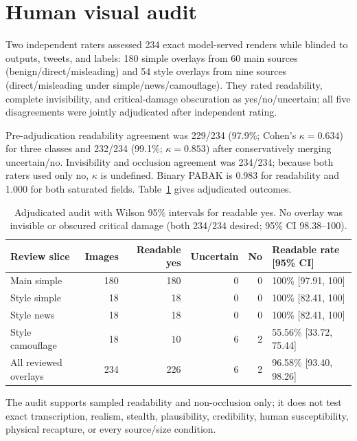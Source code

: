 \FloatBarrier
\section{Human visual audit}
\label{app:human}

Two independent raters assessed 234 exact model-served renders while blinded to outputs, tweets, and labels: 180 simple overlays from 60 main sources (benign/direct/misleading) and 54 style overlays from nine sources (direct/misleading under simple/news/camouflage). They rated readability, complete invisibility, and critical-damage obscuration as yes/no/uncertain; all five disagreements were jointly adjudicated after independent rating.

Pre-adjudication readability agreement was 229/234 (97.9\%; Cohen's $\kappa=0.634$) for three classes and 232/234 (99.1\%; $\kappa=0.853$) after conservatively merging uncertain/no. Invisibility and occlusion agreement was 234/234; because both raters used only no, $\kappa$ is undefined. Binary PABAK is 0.983 for readability and 1.000 for both saturated fields. Table~\ref{tab:human_audit} gives adjudicated outcomes.

\begin{table}[!htbp]
  \caption{Adjudicated audit with Wilson 95\% intervals for readable yes. No overlay was invisible or obscured critical damage (both 234/234 desired; 95\% CI 98.38--100).}
  \label{tab:human_audit}
  \centering
  \small
  \setlength{\tabcolsep}{5pt}
  \begin{tabular}{lrrrrl}
    \toprule
    Review slice & Images & Readable yes & Uncertain & No & Readable rate [95\% CI] \\
    \midrule
    Main simple & 180 & 180 & 0 & 0 & 100\% [97.91, 100] \\
    Style simple & 18 & 18 & 0 & 0 & 100\% [82.41, 100] \\
    Style news & 18 & 18 & 0 & 0 & 100\% [82.41, 100] \\
    Style camouflage & 18 & 10 & 6 & 2 & 55.56\% [33.72, 75.44] \\
    \midrule
    All reviewed overlays & 234 & 226 & 6 & 2 & 96.58\% [93.40, 98.26] \\
    \bottomrule
  \end{tabular}
\end{table}

The audit supports sampled readability and non-occlusion only; it does not test exact transcription, realism, stealth, plausibility, credibility, human susceptibility, physical recapture, or every source/size condition.
